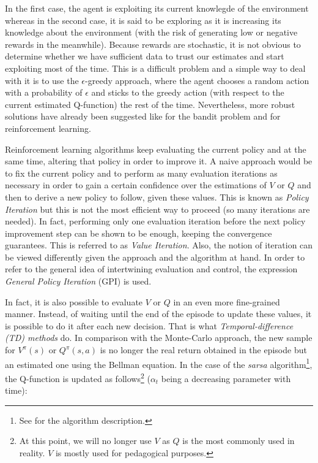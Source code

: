 				In the first case, the agent is exploiting its current knowlegde of the environment whereas in the second case, it is said to be exploring as it is increasing its knowledge about the environment (with the risk of generating low or negative rewards in the meanwhile). Because rewards are stochastic, it is not obvious to determine whether we have sufficient data to trust our estimates and start exploiting most of the time. This is a difficult problem and a simple way to deal with it is to use the $\epsilon$-greedy approach, where the agent chooses a random action with a probability of $\epsilon$ and sticks to the greedy action (with respect to the current estimated Q-function) the rest of the time. Nevertheless, more robust solutions have already been suggested like \cite{Auer2002} for the bandit problem and \cite{Auer2005} for reinforcement learning.
				
				Reinforcement learning algorithms keep evaluating the current policy and at the same time, altering that policy in order to improve it. A naive approach would be to fix the current policy and to perform as many evaluation iterations as necessary in order to gain a certain confidence over the estimations of $V$ or $Q$ and then to derive a new policy to follow, given these values. This is known as \textit{Policy Iteration} but this is not the most efficient way to proceed (so many iterations are needed). In fact, performing only one evaluation iteration before the next policy improvement step can be shown to be enough, keeping the convergence guarantees. This is referred to as \textit{Value Iteration}. Also, the notion of iteration can be viewed differently given the approach and the algorithm at hand. In order to refer to the general idea of intertwining evaluation and control, the expression \textit{General Policy Iteration} (GPI) is used.
				
				In fact, it is also possible to evaluate $V$ or $Q$ in an even more fine-grained manner. Instead, of waiting until the end of the episode to update these values, it is possible to do it after each new decision. That is what \textit{Temporal-difference (TD) methods} do. In comparison with the Monte-Carlo approach, the new sample for $V^\pi(s)$ or $Q^\pi(s,a)$ is no longer the real return obtained in the episode but an estimated one using the Bellman equation. In the case of the \textit{sarsa} algorithm\footnote{See \cite{Sutton1998} for the algorithm description.}, the Q-function is updated as follows\footnote{At this point, we will no longer use $V$ as $Q$ is the most commonly used in reality. $V$ is mostly used for pedagogical purposes.} ($\alpha_t$ being a decreasing parameter with time):
				
